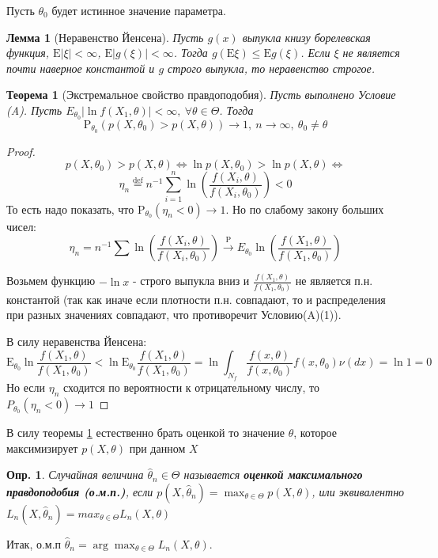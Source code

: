 \documentclass[12pt]{article}
\newtheorem{definition}{Опр.}
\newtheorem{lemma}{Лемма}
\theoremstyle{basic_theorem}
\newtheorem{theorem}{Теорема}
\theoremstyle{name_theorem}
\newcommand\defin[1]{\textbf{#1}}
\newcommand*{\defeq}{\stackrel{\text{def}}{=}}
\def\E{ \mathrm{E} }
\def\P{ \mathrm{P} }
\begin{document}
    Пусть \(\theta_0\) будет истинное значение параметра.
    \begin{lemma}[Неравенство Йенсена]
        Пусть \(g(x)\) выпукла книзу борелевская функция, \(\E\left\lvert \xi \right\rvert  <\infty\),
        \(\E\left\lvert g(\xi) \right\rvert  <\infty\). Тогда \(g(\E\xi) \leq \E g(\xi)\). Если \(\xi\)
        не является почти наверное константой и \(g\) строго выпукла, то неравенство строгое.
    \end{lemma}
    \begin{theorem}[Экстремальное свойство правдоподобия]
        \label{th::extr_plausibility}
        Пусть выполнено Условие (A). Пусть \(E_{\theta_0} \left\lvert \ln f(X_1, \theta) \right\rvert  < \infty,\ \forall \theta \in \Theta\).
        Тогда
        \[\P_{\theta_0}(p(X, \theta_0) > p(X, \theta)) \rightarrow 1,\ n\rightarrow \infty,\ \theta_0 \neq \theta\]
    \end{theorem}
    \begin{proof}
        \[p(X, \theta_0) > p(X, \theta) \Leftrightarrow \ln p(X, \theta_0) > \ln p(X, \theta) \Leftrightarrow\]
        \[\eta_n\defeq n^{-1} \sum_{i=1}^n \ln \left(\frac{f(X_i, \theta)}{f(X_i, \theta_0)}\right) < 0\]
    То есть надо показать, что \(\P_{\theta_0}(\eta_n < 0) \rightarrow 1\). Но по слабому закону больших чисел:
    \[\eta_n = n^{-1}\sum \ln \left(\frac{f(X_i, \theta)}{f(X_i, \theta_0)} \right) \xrightarrow{\P}
    E_{\theta_0}\ln \left(\frac{f(X_1, \theta)}{f(X_1, \theta_0)} \right) \]

    Возьмем функцию \(-\ln x\) - строго выпукла вниз и \(\frac{f(X_1, \theta)}{f(X_1, \theta_0)}\)
    не является п.н. константой (так как иначе если плотности п.н. совпадают,
    то и распределения при разных значениях совпадают, что противоречит Условию(A)(1)).

    В силу неравенства Йенсена:
    \[\E_{\theta_0} \ln \frac{f(X_1, \theta)}{f(X_1, \theta_0)} < \ln \E_{\theta_0} \frac{f(X_1, \theta)}{f(X_1, \theta_0)} = \ln \int_{N_f} \frac{f(x, \theta)}{f(x, \theta_0)} f(x, \theta_0) \nu(dx) = \ln1 = 0\]
    Но если \(\eta_n\) сходится по вероятности к отрицательному числу, то \(P_{\theta_0}(\eta_n < 0) \rightarrow 1\)
\end{proof}
    В силу теоремы \ref{th::extr_plausibility} естественно брать
    оценкой то значение \(\theta\), которое максимизирует \(p(X, \theta)\) при данном \(X\)

    \begin{definition}
        Случайная величина \(\widehat{\theta}_n \in \Theta\) называется
        \defin{оценкой максимального правдоподобия (о.м.п.)}, если
        \(p(X, \widehat{\theta}_n) = \max_{\theta\in\Theta} p(X, \theta)\),
        или эквивалентно \(L_n(X, \widehat{\theta}_n) = max_{\theta\in\Theta} L_n(X, \theta)\)
    \end{definition}
    Итак, о.м.п \(\widehat{\theta}_n = \arg\max_{\theta\in\Theta} L_n(X, \theta)\).
\end{document}

